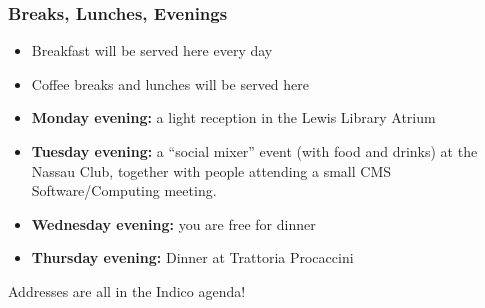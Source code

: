 \begin{frame}
\frametitle{Breaks, Lunches, Evenings}

\begin{itemize}
\item Breakfast will be served here every day
\item Coffee breaks and lunches will be served here
\item {\bf Monday evening:} a light reception in the Lewis Library Atrium
\item {\bf Tuesday evening:} a ``social mixer'' event (with food and drinks) at the Nassau Club, together with people attending a small CMS Software/Computing meeting.
\item {\bf Wednesday evening:} you are free for dinner
\item {\bf Thursday evening:} Dinner at Trattoria Procaccini
\end{itemize}

Addresses are all in the Indico agenda!

\end{frame}


